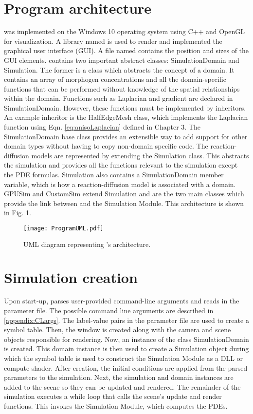 \section{Program architecture} 
\ProgramName{} was implemented on the Windows 10 operating system using C++ and OpenGL for visualization. A library named  \citep{cornut2019} is used to render and implemented the graphical user interface (GUI). A file named  contains the position and sizes of the GUI elements. \ProgramName{} contains two important abstract classes: SimulationDomain and Simulation. The former is a class which abstracts the concept of a domain. It contains an array of morphogen concentrations and all the domain-specific functions that can be performed without knowledge of the spatial relationships within the domain. Functions such as Laplacian and gradient are declared in SimulationDomain. However, these functions must be implemented by inheritors. An example inheritor is the HalfEdgeMesh class, which implements the Laplacian function using Eqn. \ref{eq:anisoLaplacian} defined in Chapter 3. The SimulationDomain base class provides an extensible way to add support for other domain types without having to copy non-domain specific code. The reaction-diffusion models are represented by extending the Simulation class. This abstracts the simulation and provides all the functions relevant to the simulation except the PDE formulas. Simulation also contains a SimulationDomain member variable, which is how a reaction-diffusion model is associated with a domain. GPUSim and CustomSim extend Simulation and are the two main classes which provide the link between \ProgramName{} and the Simulation Module. This architecture is shown in Fig. \ref{fig:umlDiagram}.

\begin{figure}[H]
	\centering
	\texttt{[image: ProgramUML.pdf]}
	\caption{UML diagram representing \ProgramName{}'s architecture.}
	\label{fig:umlDiagram}
\end{figure}

\section{Simulation creation}
Upon start-up, \ProgramName{} parses user-provided command-line arguments and reads in the parameter file. The possible command line arguments are described in \ref{appendix:CLargs}. The label-value pairs in the parameter file are used to create a symbol table. Then, the window is created along with the camera and scene objects responsible for rendering. Now, an instance of the class SimulationDomain is created. This domain instance is then used to create a Simulation object during which the symbol table is used to construct the Simulation Module as a DLL or compute shader. After creation, the initial conditions are applied from the parsed parameters to the simulation. Next, the simulation and domain instances are added to the scene so they can be updated and rendered. The remainder of the simulation executes a while loop that calls the scene's update and render functions. This invokes the Simulation Module, which computes the PDEs.

